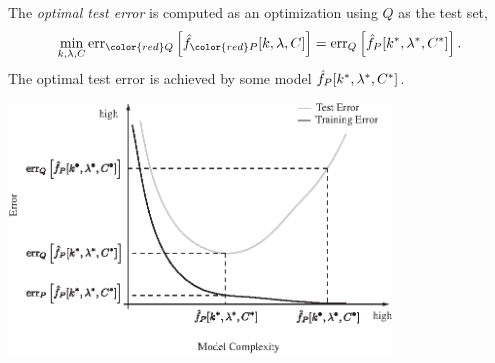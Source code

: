 \documentclass[a4paper,blends,pdf,colorBG,slideColor]{prosper}
\begin{document}
The {\em optimal test error} is computed as an optimization using $Q$ as the test set,
\begin{equation*}
\min_{k,\lambda,C} \err_{\color{red}Q}\left [\model{f}_{\color{red}P}[k,\lambda,C]\right] = \err_Q\left [\model{f}_P[k^*,\lambda^*,C^*]\right].
\end{equation*}
The optimal test error is achieved by some model $\hat{f}_P[k^*,\lambda^*,C^*]$.

\es


\begin{center}
\includegraphics[width=4in]{figures/fig09-02.eps}
\end{center}
\es
\end{document}
